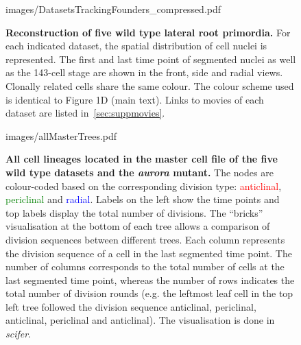 \documentclass[11pt,a4paper, final]{article}
\begin{document}
%
%
\clearpage
\begin{figure}[htbp]
\centering
	\begin{overpic}[width=1.\linewidth]{images/DatasetsTrackingFounders_compressed.pdf}
	\end{overpic}
\caption[Reconstruction of five wild type lateral root primordia.]
{{\bf Reconstruction of five wild type lateral root primordia.} For each indicated dataset, the spatial distribution of cell nuclei is represented. The first and last time point of segmented nuclei as well as the 143-cell stage are shown in the front, side and radial views. Clonally related cells share the same colour. The colour scheme used is identical to Figure 1D (main text). Links to movies of each dataset are listed in~\ref{sec:suppmovies}.}
	\label{fig:trackingfounders}
\end{figure}
%
\clearpage
%
\begin{figure}[htbp]
\centering
		\begin{overpic}[width=.85\linewidth]{images/allMasterTrees.pdf}
		\end{overpic}
\caption[All cell lineages located in the master cell file of the five wild type datasets and the \emph{aurora} mutant.]
{
{\bf All cell lineages located in the master cell file of the five wild type datasets and the \emph{aurora} mutant.} The nodes are colour-coded based on the corresponding division type: \textcolor{red}{anticlinal}, \textcolor{green}{periclinal} and \textcolor{blue}{radial}. Labels on the left show the time points and top labels display the total number of divisions. The ``bricks'' visualisation at the bottom of each tree allows a comparison of division sequences between different trees. Each column represents the division sequence of a cell in the last segmented time point. The number of columns corresponds to the total number of cells at the last segmented time point, whereas the number of rows indicates the total number of division rounds (e.g. the leftmost leaf cell in the top left tree followed the division sequence anticlinal, periclinal, anticlinal, periclinal and anticlinal). The visualisation is done in \textit{scifer}.
}
	\label{fig:allMasterTrees}
\end{figure}
\end{document}
